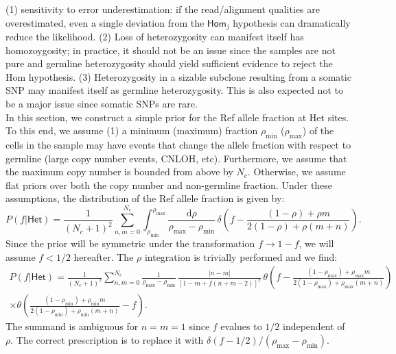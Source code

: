 \documentclass[nofootinbib,amssymb,amsmath]{revtex4}
\begin{document}
 (1) sensitivity to error underestimation: if the read/alignment qualities are overestimated, even a single deviation from the $\mathsf{Hom}_j$ hypothesis can dramatically reduce the likelihood. (2) Loss of heterozygosity can manifest itself has homozoygosity; in practice, it should not be an issue since the samples are not pure and germline heterozygosity should yield sufficient evidence to reject the Hom hypothesis. (3) Heterozygosity in a sizable subclone resulting from a somatic SNP may manifest itself as germline heterozygosity. This is also expected not to be a major issue since somatic SNPs are rare.\\


 In this section, we construct a simple prior for the Ref allele fraction at Het sites. To this end, we assume (1) a minimum (maximum) fraction $\rho_\mathrm{min}$ ($\rho_\mathrm{max}$) of the cells in the sample may have events that change the allele fraction with respect to germline (large copy number events, CNLOH, etc). Furthermore, we assume that the maximum copy number is bounded from above by $N_c$. Otherwise, we assume flat priors over both the copy number and non-germline fraction. Under these assumptions, the distribution of the Ref allele fraction is given by:
\begin{equation}
P(f|\mathsf{Het}) = \frac{1}{(N_c + 1)^2}\sum_{n,m=0}^{N_c}\int_{\rho_\mathrm{min}}^{\rho_\mathrm{max}}\frac{\mathrm{d}\rho}{\rho_\mathrm{max} - \rho_\mathrm{min}}\,\delta\left(f - \frac{(1-\rho) + \rho m}{2(1-\rho) + \rho(m+n)}\right).
\end{equation}
Since the prior will be symmetric under the transformation $f \rightarrow 1 - f$, we will assume $f<1/2$ hereafter. The $\rho$ integration is trivially performed and we find:
\begin{multline}\label{eq:AFdisc}
P(f|\mathsf{Het}) = \frac{1}{(N_c + 1)^2}\sum_{n,m=0}^{N_c}\frac{1}{\rho_\mathrm{max} - \rho_\mathrm{min}}\,\frac{|n-m|}{[1 - m + f(n+m-2)]^2} \, \theta\left(f - \frac{(1-\rho_\mathrm{max}) + \rho_\mathrm{max} m}{2(1-\rho_\mathrm{max}) + \rho_\mathrm{max}(m+n)}\right) \\
\times \theta\left(\frac{(1-\rho_\mathrm{min}) + \rho_\mathrm{min} m}{2(1-\rho_\mathrm{min}) + \rho_\mathrm{min}(m+n)} - f\right).
\end{multline}
The summand is ambiguous for $n=m=1$ since $f$ evalues to $1/2$ independent of $\rho$. The correct prescription is to replace it with $\delta(f-1/2)/(\rho_\mathrm{max} - \rho_\mathrm{min})$.
\end{document}
